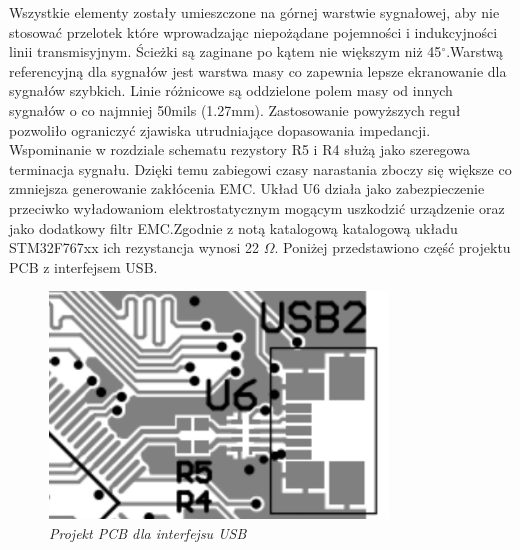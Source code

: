 \documentclass[eng,printmode]{mgr}
\begin{document}
Wszystkie elementy zostały umieszczone na górnej warstwie sygnałowej, aby nie stosować przelotek które wprowadzając niepożądane pojemności i indukcyjności linii transmisyjnym. Ścieżki są zaginane po kątem nie większym niż 45$^\circ$.Warstwą referencyjną dla sygnałów jest warstwa masy co zapewnia lepsze ekranowanie dla sygnałów szybkich. Linie różnicowe są oddzielone polem masy od innych sygnałów o co najmniej 50mils (1.27mm). Zastosowanie powyższych reguł pozwoliło ograniczyć zjawiska utrudniające dopasowania impedancji. Wspominanie w rozdziale schematu rezystory R5 i R4 służą jako szeregowa terminacja sygnału. Dzięki temu zabiegowi czasy narastania zboczy się większe co zmniejsza generowanie zakłócenia EMC. Układ U6 działa jako zabezpieczenie przeciwko wyładowaniom elektrostatycznym mogącym uszkodzić urządzenie oraz jako dodatkowy filtr EMC.Zgodnie z notą katalogową katalogową układu STM32F767xx ich rezystancja wynosi 22 \textbf{$\Omega$}. Poniżej przedstawiono część projektu PCB z interfejsem USB.

\begin{figure}[!h]
    \centering
    \includegraphics[width=9cm]{pcb/usb.png}
    \caption{\textit{\scriptsize Projekt PCB dla interfejsu USB}}
\end{figure}
\end{document}
